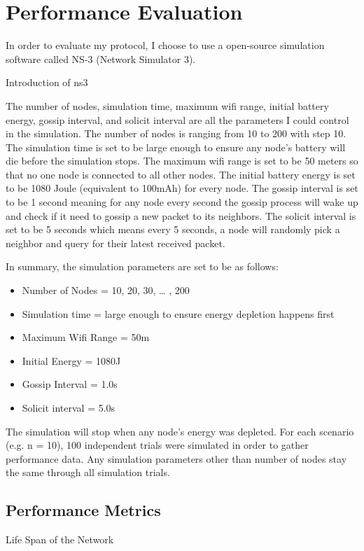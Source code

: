 \chapter{Performance Evaluation}

In order to evaluate my protocol, I choose to use a open-source simulation software called NS-3 (Network Simulator 3). 

Introduction of ns3

The number of nodes, simulation time, maximum wifi range, initial battery energy, gossip interval, and solicit interval are all the parameters I could control in the simulation. The number of nodes is ranging from 10 to 200 with step 10. The simulation time is set to be large enough to ensure any node's battery will die before the simulation stops. The maximum wifi range is set to be 50 meters so that no one node is connected to all other nodes. The initial battery energy is set to be 1080 Joule (equivalent to 100mAh) for every node. The gossip interval is set to be 1 second meaning for any node every second the gossip process will wake up and check if it need to gossip a new packet to its neighbors. The solicit interval is set to be 5 seconds which means every 5 seconds, a node will randomly pick a neighbor and query for their latest received packet. 

In summary, the simulation parameters are set to be as follows:
\begin{itemize}
	\item Number of Nodes = 10, 20, 30, … , 200
	\item Simulation time = large enough to ensure energy depletion happens first
	\item Maximum Wifi Range = 50m
	\item Initial Energy = 1080J
	\item Gossip Interval = 1.0s
	\item Solicit interval = 5.0s 
\end{itemize}


The simulation will stop when any node's energy was depleted. For each scenario (e.g. n = 10), 100 independent trials were simulated in order to gather performance data. Any simulation parameters other than number of nodes stay the same through all simulation trials. 


\section{Performance Metrics}
Life Span of the Network

